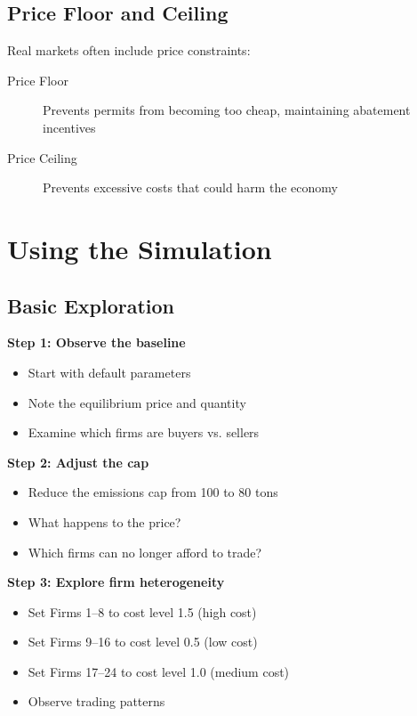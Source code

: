 \documentclass{tufte-handout}\usepackage[]{graphicx}\usepackage[]{xcolor}
\begin{document}
\subsection{Price Floor and Ceiling}

Real markets often include price constraints:

\begin{description}
\item[Price Floor] Prevents permits from becoming too cheap, maintaining abatement incentives
\item[Price Ceiling] Prevents excessive costs that could harm the economy
\end{description}

\section{Using the Simulation}

\subsection{Basic Exploration}

\textbf{Step 1: Observe the baseline}
\begin{itemize}
\item Start with default parameters
\item Note the equilibrium price and quantity
\item Examine which firms are buyers vs. sellers
\end{itemize}

\textbf{Step 2: Adjust the cap}
\begin{itemize}
\item Reduce the emissions cap from 100 to 80 tons
\item What happens to the price?
\item Which firms can no longer afford to trade?
\end{itemize}

\textbf{Step 3: Explore firm heterogeneity}
\begin{itemize}
\item Set Firms 1--8 to cost level 1.5 (high cost)
\item Set Firms 9--16 to cost level 0.5 (low cost)
\item Set Firms 17--24 to cost level 1.0 (medium cost)
\item Observe trading patterns
\end{itemize}
\end{document}
